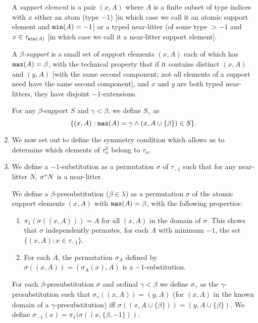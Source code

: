 \documentclass[12pt]{article}
\begin{document}
\begin{enumerate}
A {\em support element\/} is a pair $(x,A)$ where $A$ is a finite subset of type indices with $x$ either an atom (type $-1$) [in which case we call it an atomic support element and ${\tt min}(A) =-1$] or a typed near-litter (of some type $>-1$ and $x \in \tau_{{\tt min}(A)}$ [in which case we call it a near-litter support element].

A {\em $\beta$-support\/} is a small set of support elements $(x,A)$ each of which has ${\tt max}(A)=\beta$, with the technical property that if it contains distinct $(x,A)$ and $(y,A)$ [with the same second component;  not all elements of a support need have the same second component], and $x$ and $y$ are both typed near-litters, they have disjoint $-1$-extensions.

For any $\beta$-support $S$ and $\gamma<\beta$, we define $S_\gamma$ as $$\{(x,A):{\tt max}(A)=\gamma \wedge (x,A\cup \{\beta\}) \in S\}.$$

\item  We now set out to define the symmetry condition which allows us to determine which elements of $\tau^3_\alpha$ belong to $\tau_\alpha$.

\item We define a $-1$-substitution as a permutation $\sigma$ of $\tau_{-1}$ such that for any near-litter $N$, $\sigma``N$ is a near-litter.

We define a $\beta$-presubstitution ($\beta\in \lambda$) as a permutation $\sigma$ of the atomic support elements $(x,A)$ with ${\tt max}(A)=\beta$, with the following properties:

\begin {enumerate}

\item $\pi_1(\sigma((x,A))) = A$ for all $(x,A)$ in the domain of $\sigma$.  This shows that $\sigma$ independently permutes, for each $A$ with minimum $-1$, the set $\{(x,A):x \in \tau_{-1}\}$.

\item For each $A$, the permutation $\sigma_A$ defined by $\sigma((x,A)) = (\sigma_A(x),A)$ is a $-1$-substitution.

\end{enumerate}

For each $\beta$-presubstitution $\sigma$ and ordinal $\gamma<\beta$ we define $\sigma_\gamma$ as the $\gamma$-presubstitution such that $\sigma_\gamma((x,A)) = (y,A)$ (for $(x,A)$ in the known domain of a $\gamma$-presubstitution) iff $\sigma((x,A \cup \{\beta\})) = (y,A \cup \{\beta\})$.
We define $\sigma_{-1}(x) = \pi_1(\sigma((x,\{\beta,-1\}))$.


\end{enumerate}
\end{document}
